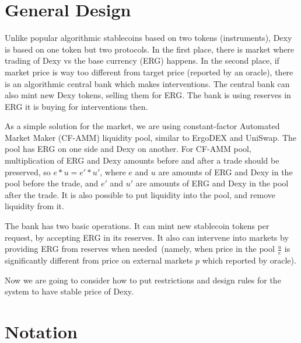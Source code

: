 \documentclass{article}   %
\newcommand{\bc}{ERG}
\newcommand{\sct}{stablecoin}
\newcommand{\dx}{Dexy}
\begin{document}
\section{General Design}

Unlike popular algorithmic stablecoins based on two tokens (instruments), \dx{} is based on one token but two protocols. In the first place, 
there is market where trading of \dx{} vs the base currency (\bc{}) happens. In the second place, if market price is way too different from target price (reported by an oracle), there is an algorithmic central bank which makes interventions. The central bank can also mint new \dx{} tokens, selling them for \bc{}. The bank is using reserves in \bc{} it is buying for interventions then. 

As a simple solution for the market, we are using constant-factor Automated Market Maker (CF-AMM) liquidity pool, similar to ErgoDEX and UniSwap. The pool has \bc{} on one side and \dx{} on another. For CF-AMM pool, multiplication of \bc{} and \dx{} amounts before and after a trade should be preserved, so $e * u = e' * u'$, where $e$ and $u$ are amounts of \bc{} and \dx{} in the pool before the trade, and $e'$ and $u'$ are amounts of \bc{} and \dx{} in the pool after the trade. It is also possible to put liquidity into the pool, and remove liquidity from it. 

The bank has two basic operations. It can mint new \sct{} tokens per request, by accepting \bc{} in its reserves. It also can intervene into markets by providing \bc{} from reserves when needed~(namely, when price in the pool $\frac{u}{e}$ is significantly different from price on external markets $p$ which reported by oracle).

Now we are going to consider how to put restrictions and design rules for the system to have stable price of \dx{}. 

\section{Notation}
\end{document}
